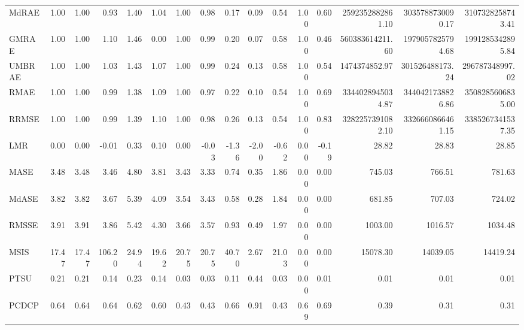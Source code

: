 \begin{tabular}{l|rrrrr|rrrrr|rrrrr}
MdRAE & 1.00 & 1.00 & 0.93 & 1.40 & 1.04 & 1.00 & 0.98 & 0.17 & 0.09 & 0.54 & 1.00 & 0.60 & 2592352882861.10 & 3035788730090.17 & 3107328258743.41 \\
GMRAE & 1.00 & 1.00 & 1.10 & 1.46 & 0.00 & 1.00 & 0.99 & 0.20 & 0.07 & 0.58 & 1.00 & 0.46 & 560383614211.60 & 1979057825794.68 & 1991285342895.84 \\
UMBRAE & 1.00 & 1.00 & 1.03 & 1.43 & 1.07 & 1.00 & 0.99 & 0.24 & 0.13 & 0.58 & 1.00 & 0.54 & 1474374852.97 & 301526488173.24 & 296787348997.02 \\
RMAE & 1.00 & 1.00 & 0.99 & 1.38 & 1.09 & 1.00 & 0.97 & 0.22 & 0.10 & 0.54 & 1.00 & 0.69 & 3344028945034.87 & 3440421738826.86 & 3508285606835.00 \\
RRMSE & 1.00 & 1.00 & 0.99 & 1.39 & 1.10 & 1.00 & 0.98 & 0.26 & 0.13 & 0.54 & 1.00 & 0.83 & 3282257391082.10 & 3326660866461.15 & 3385267341537.35 \\
LMR & 0.00 & 0.00 & -0.01 & 0.33 & 0.10 & 0.00 & -0.03 & -1.36 & -2.00 & -0.62 & 0.00 & -0.19 & 28.82 & 28.83 & 28.85 \\
MASE & 3.48 & 3.48 & 3.46 & 4.80 & 3.81 & 3.43 & 3.33 & 0.74 & 0.35 & 1.86 & 0.00 & 0.00 & 745.03 & 766.51 & 781.63 \\
MdASE & 3.82 & 3.82 & 3.67 & 5.39 & 4.09 & 3.54 & 3.43 & 0.58 & 0.28 & 1.84 & 0.00 & 0.00 & 681.85 & 707.03 & 724.02 \\
RMSSE & 3.91 & 3.91 & 3.86 & 5.42 & 4.30 & 3.66 & 3.57 & 0.93 & 0.49 & 1.97 & 0.00 & 0.00 & 1003.00 & 1016.57 & 1034.48 \\
MSIS & 17.47 & 17.47 & 106.20 & 24.94 & 19.62 & 20.75 & 20.75 & 40.70 & 2.67 & 21.03 & 0.00 & 0.00 & 15078.30 & 14039.05 & 14419.24 \\
PTSU & 0.21 & 0.21 & 0.14 & 0.23 & 0.14 & 0.03 & 0.03 & 0.11 & 0.44 & 0.03 & 0.00 & 0.01 & 0.01 & 0.01 & 0.01 \\
PCDCP & 0.64 & 0.64 & 0.64 & 0.62 & 0.60 & 0.43 & 0.43 & 0.66 & 0.91 & 0.43 & 0.69 & 0.69 & 0.39 & 0.31 & 0.31 \\
\bottomrule
\end{tabular}
